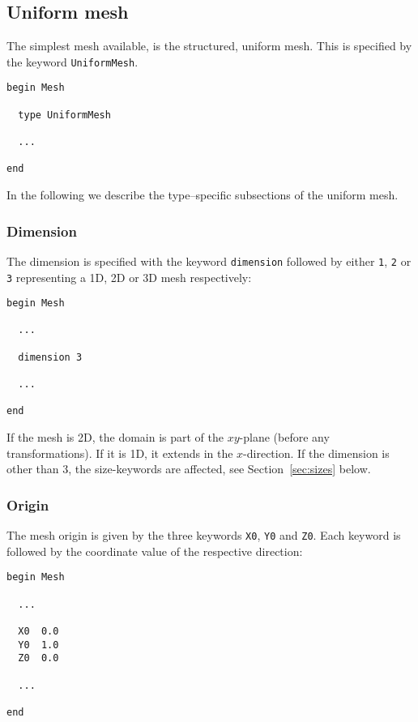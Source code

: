 \subsection{Uniform mesh}
\label{sec:uniform-mesh}

The simplest mesh available, is the structured, uniform mesh. This is
specified by the keyword \texttt{UniformMesh}.
%
\begin{verbatim}
begin Mesh

  type UniformMesh

  ...

end
\end{verbatim}
%

In the following we describe the type--specific subsections of the
uniform mesh.

\subsubsection{Dimension}
\label{sec:mesh-dimension}

The dimension is specified with the keyword \texttt{dimension}
followed by either \texttt{1}, \texttt{2} or \texttt{3} representing a
1D, 2D or 3D mesh respectively:
%
\begin{verbatim}
begin Mesh

  ...

  dimension 3

  ...

end
\end{verbatim}
%
If the mesh is 2D, the domain is part of the $xy$-plane (before any
transformations). If it is 1D, it extends in the $x$-direction. If the
dimension is other than 3, the size-keywords are affected, see
Section~\ref{sec:sizes} below.

\subsubsection{Origin}
\label{sec:origin}

The mesh origin is given by the three keywords \texttt{X0},
\texttt{Y0} and \texttt{Z0}. Each keyword is followed by the
coordinate value of the respective direction:
%
\begin{verbatim}
begin Mesh

  ...

  X0  0.0
  Y0  1.0
  Z0  0.0

  ...

end
\end{verbatim}


